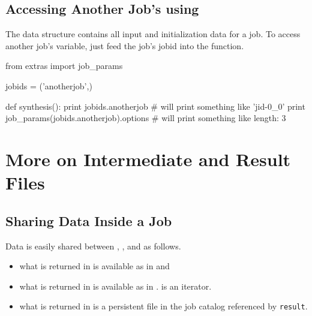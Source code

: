 \subsection{Accessing Another Job's \params using \jobparams}

The \params data structure contains all input and initialization data
for a job.  To access another job's \params variable, just feed the
job's jobid into the \jobparams function.
\\
\begin{python}
from extras import job_params

jobids = ('anotherjob',)

def synthesis():
  print jobids.anotherjob
  # will print something like 'jid-0_0'
  print job_params(jobids.anotherjob).options
  # will print something like {length: 3}
\end{python}




\newpage
\section{More on Intermediate and Result Files}

\subsection{Sharing Data Inside a Job}
Data is easily shared between \prepare, \analysis, and \synthesis as
follows.
\begin{itemize}
\item what is returned in \prepare is available as \prepareres in \analysis and \synthesis
\item what is returned in \analysis is available as \analysisres in \synthesis.  \analysisres is an iterator.
\item what is returned in \synthesis is a persistent file in the job catalog referenced by \texttt{result}.
\end{itemize}

